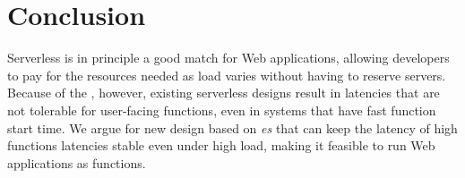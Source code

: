 \section{Conclusion}

Serverless is in principle a good match for Web applications, allowing
developers to pay for the resources needed as load varies without
having to reserve servers. Because of the \problem, however, existing
serverless designs result in latencies that are not tolerable for
user-facing functions, even in systems that have fast function start
time.  We argue for new design based on \emph{\priceclass{}es} that
can keep the latency of high \class{} functions latencies stable even
under high load, making it feasible to run Web applications as
functions.
